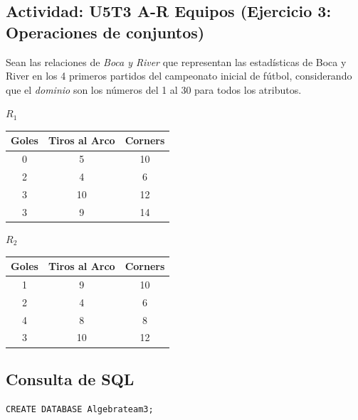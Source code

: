 \documentclass[a4paper, 12pt]{article}
\begin{document}
\begin{justify}
        \section{Actividad: U5T3 A-R Equipos (Ejercicio 3: Operaciones de conjuntos)}
        \justify
        Sean las relaciones de \emph{Boca y River} que representan las estadísticas de Boca y River en los 4 primeros partidos del campeonato inicial de fútbol, considerando
        que el \emph{dominio} son los números del 1 al 30 para todos los atributos.
        \begin{table}[H]
            \(R_1\)\\
            \begin{tabular}{|c|c|c|}
            \hline
            \textbf{Goles} & \textbf{Tiros al Arco} & \textbf{Corners} \\ \hline
            0              & 5                      & 10               \\ \hline
            2              & 4                      & 6                \\ \hline
            3              & 10                     & 12               \\ \hline
            3              & 9                      & 14               \\ \hline
            \end{tabular}
        \end{table}
        \begin{table}[H]
            \(R_2\)\\
            \begin{tabular}{|c|c|c|}
            \hline
            \textbf{Goles} & \textbf{Tiros al Arco} & \textbf{Corners} \\ \hline
            1              & 9                      & 10               \\ \hline
            2              & 4                      & 6                \\ \hline
            4              & 8                      & 8                \\ \hline
            3              & 10                     & 12               \\ \hline
            \end{tabular}
            \end{table}
        \subsection{Consulta de SQL}
\begin{verbatim}
CREATE DATABASE Algebrateam3;
    

\end{verbatim}
\end{justify}
\end{document}
